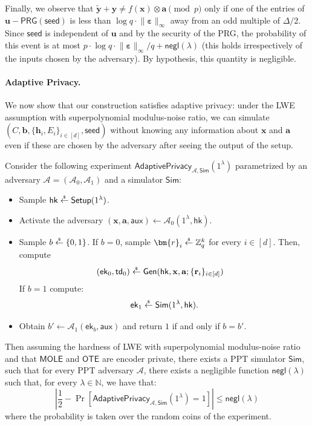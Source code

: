 \documentclass{theoretics}
\newcommand{\ek}{\mathsf{ek}}
\newcommand{\td}{\mathsf{td}}
\newcommand{\MOLE}{\mathsf{MOLE}}
\newcommand{\getsr}{\overset{\raisebox{-1pt}{$\scriptscriptstyle \$$}}{\gets}}
\newcommand{\sample}{\getsr}
\newcommand{\OTE}{\mathsf{OTE}}
\newcommand{\N}{\mathbb{N}}
\newcommand{\Z}{\mathbb{Z}}
\newcommand{\negl}{\mathsf{negl}}
\renewcommand{\sec}{\ensuremath{\lambda}}
\newcommand{\aux}{\mathsf{aux}}
\newcommand{\Sim}{\mathsf{Sim}}
\newcommand{\Adv}{\mathcal{A}}
\newcommand{\algofont}[1]{\ensuremath{\mathsf{#1}}}
\newcommand{\Setup}{{\algofont{Setup}}}
\newcommand{\Gen}{{\algofont{Gen}}}
\newcommand{\hk}{\ensuremath{\mathsf{hk}}}
\newcommand{\thmlab}[1]{\label{thm:#1}}
\newcommand\bbbone{1}
\begin{document}
    Finally, we observe that $\tilde{\mathbf{y}}+\mathbf{y}\ne f(\mathbf{x})\otimes \mathbf{a}\pmod p$ only if one of the entries of $\mathbf{u}-\mathsf{PRG}(\mathsf{seed})$ is less than $\log q\cdot \lVert \bm{\varepsilon}\rVert_\infty$ away from an odd multiple of $\Delta/2$. Since $\mathsf{seed}$ is independent of $\mathbf{u}$ and by the security of the PRG, the probability of this event is at most $p\cdot \log q\cdot \lVert\bm{\varepsilon}\rVert_\infty/q+\negl(\sec)$ {(this holds irrespectively of the inputs chosen by the adversary).} By hypothesis, this quantity is negligible.

\paragraph{Adaptive Privacy.} We now show that our construction satisfies adaptive privacy: under the LWE assumption with superpolynomial modulus-noise ratio, we can simulate $(C, \mathbf{b}, \{\mathbf{h}_i, E_i\}_{i\in[d]}, \mathsf{seed})$ without knowing any information about $\mathbf{x}$ and $\mathbf{a}$ even if these are chosen by the adversary after seeing the output of the setup. 
\begin{theorem}
\thmlab{RMSLFE}
    Consider the following experiment $\mathsf{AdaptivePrivacy}_{\Adv, \Sim}(\bbbone^\sec)$ parametrized by an adversary $\Adv = (\Adv_0, \Adv_1)$ and a simulator $\Sim$:
\begin{itemize}
\item Sample $\hk\sample\Setup(\bbbone^\sec)$.
\item Activate the adversary $(\mathbf{x}, \mathbf{a}, \aux)\gets\Adv_0(\bbbone^\sec, \hk)$.
\item Sample $b\sample\{0, 1\}$. If $b = 0$, sample $\bm{r}_{i}\sample\Z_q^k$ for every $i\in[d]$. Then, compute 
\begin{align*}
    (\ek_0, \td_0)&\sample\Gen(\hk, \mathbf{x}, \mathbf{a}; \{\mathbf{r}_i\}_{i\in[d]})
\end{align*}
If $b=1$ compute:
\[
\ek_1\sample\Sim(\bbbone^\sec, \hk).
\]
\item Obtain $b' \gets \Adv_1(\ek_b, \aux)$ and return $1$ if and only if $b=b'$.
\end{itemize}
Then assuming the hardness of LWE with superpolynomial modulus-noise ratio and that $\MOLE$ and $\OTE$ are encoder private, there exists a PPT simulator $\Sim$, such that for every PPT adversary $\mathcal{A}$, there exists a negligible function $\negl(\sec)$ such that, for every $\sec\in\N$, we have that:
\[
\left|\frac{1}{2} - \Pr\left[\mathsf{AdaptivePrivacy}_{\mathcal{A}, \Sim}(\bbbone^\sec) = 1\right] \right|\le\negl(\sec)
\]
where the probability is taken over the random coins of the experiment.

\end{theorem}
\end{document}

